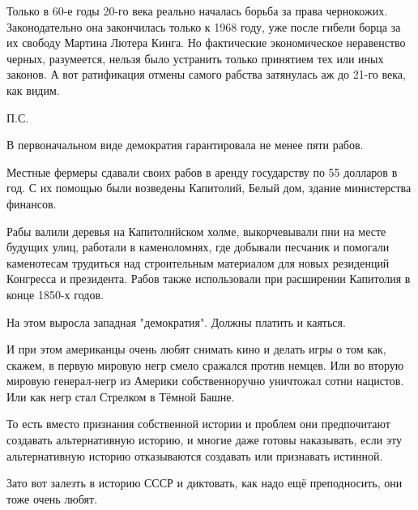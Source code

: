 Только в 60-е годы 20-го века реально началась борьба за права чернокожих.
Законодательно она закончилась только к 1968 году, уже после гибели борца за их
свободу Мартина Лютера Кинга. Но фактические экономическое неравенство черных,
разумеется, нельзя было устранить только принятием тех или иных законов. А вот
ратификация отмены самого рабства затянулась аж до 21-го века, как видим.

П.С.

В первоначальном виде демократия гарантировала не менее пяти рабов.

Местные фермеры сдавали своих рабов в аренду государству по 55 долларов в год.
С их помощью были возведены Капитолий, Белый дом, здание министерства финансов.

Рабы валили деревья на Капитолийском холме, выкорчевывали пни на месте будущих
улиц, работали в каменоломнях, где добывали песчаник и помогали каменотесам
трудиться над строительным материалом для новых резиденций Конгресса и
президента. Рабов также использовали при расширении Капитолия в конце 1850-х
годов.

На этом выросла западная "демократия". Должны платить и каяться.

И при этом американцы очень любят снимать кино и делать игры о том как, скажем,
в первую мировую негр смело сражался против немцев. Или во вторую мировую
генерал-негр из Америки собственноручно уничтожал сотни нацистов. Или как негр
стал Стрелком в Тёмной Башне.

То есть вместо признания собственной истории и проблем они предпочитают
создавать альтернативную историю, и многие даже готовы наказывать, если эту
альтернативную историю отказываются создавать или признавать истинной.

Зато вот залезть в историю СССР и диктовать, как надо ещё преподносить, они
тоже очень любят.
  
